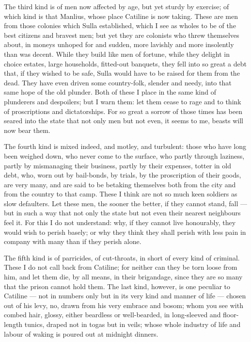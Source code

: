  The third kind is of men now affected by age, but yet sturdy by exercise; of which kind is that Manlius, whose place Catiline is now taking. These are men from those colonies which Sulla established, which I see as wholes to be of the best citizens and bravest men; but yet they are colonists who threw themselves about, in moneys unhoped for and sudden, more lavishly and more insolently than was decent. While they build like men of fortune, while they delight in choice estates, large households, fitted-out banquets, they fell into so great a debt that, if they wished to be safe, Sulla would have to be raised for them from the dead. They have even driven some country-folk, slender and needy, into that same hope of the old plunder. Both of these I place in the same kind of plunderers and despoilers; but I warn them: let them cease to rage and to think of proscriptions and dictatorships. For so great a sorrow of those times has been seared into the state that not only men but not even, it seems to me, beasts will now bear them.

 The fourth kind is mixed indeed, and motley, and turbulent: those who have long been weighed down, who never come to the surface, who partly through laziness, partly by mismanaging their business, partly by their expenses, totter in old debt, who, worn out by bail-bonds, by trials, by the proscription of their goods, are very many, and are said to be betaking themselves both from the city and from the country to that camp. These I think are not so much keen soldiers as slow defaulters. Let these men, the sooner the better, if they cannot stand, fall --- but in such a way that not only the state but not even their nearest neighbours feel it. For this I do not understand: why, if they cannot live honourably, they would wish to perish basely; or why they think they shall perish with less pain in company with many than if they perish alone.

 The fifth kind is of parricides, of cut-throats, in short of every kind of criminal. These I do not call back from Catiline; for neither can they be torn loose from him, and let them die, by all means, in their brigandage, since they are so many that the prison cannot hold them. The last kind, however, is one peculiar to Catiline --- not in numbers only but in its very kind and manner of life --- chosen out of his levy, no, drawn from his very embrace and bosom; whom you see with combed hair, glossy, either beardless or well-bearded, in long-sleeved and floor-length tunics, draped not in togas but in veils; whose whole industry of life and labour of waking is poured out at midnight dinners.

